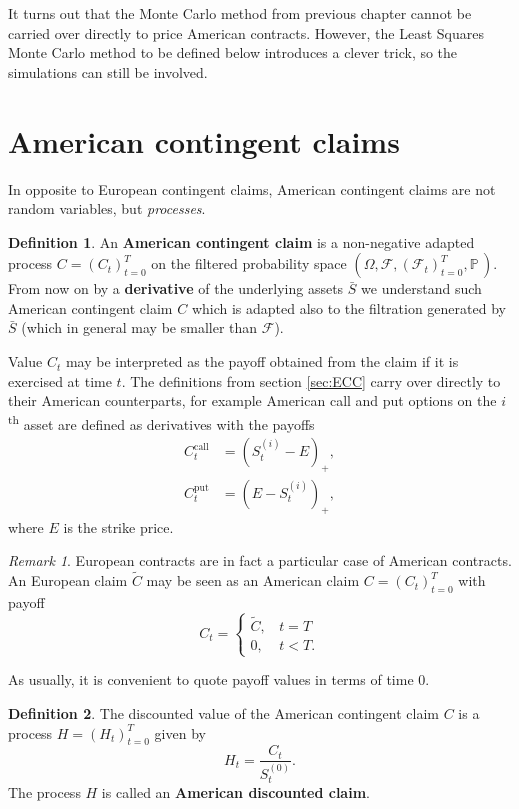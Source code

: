 \documentclass[a4paper,11pt, twoside]{book}
\theoremstyle{definition}
\newtheorem{mydef}{Definition}[chapter]
\theoremstyle{remark}
\newtheorem{remark}{Remark}[chapter]
\newcounter{example}[chapter]
\def\P{{\mathbb{P}}\,}
\def\Sa{\bar{S}}
\begin{document}
It turns out that the Monte Carlo method from previous chapter cannot be carried over directly to price American contracts. However, the Least Squares Monte Carlo method to be defined below introduces a clever trick, so the simulations can still be involved. 

\section{American contingent claims}
In opposite to European contingent claims, American contingent claims are not random variables, but \emph{processes}.
\begin{mydef}
 \label{def:cc_am}
 An \textbf{American contingent claim} is a non-negative adapted process $C = (C_t)_{t=0}^T$ on the filtered probability space $(\Omega, \mathcal{F}, (\mathcal{F}_t)_{t=0}^T, \P)$.
From now on by a \textbf{derivative} of the underlying assets $\Sa$ we understand such American contingent claim $C$ which is adapted also to the filtration generated by $\Sa$ (which in general may be smaller than $\mathcal{F}$).
\end{mydef}
Value $C_t$ may be interpreted as the payoff obtained from the claim if it is exercised at time $t$. The definitions from section \ref{sec:ECC} carry over directly to their American counterparts, for example American call and put options on the $i$\textsuperscript{th} asset are defined as derivatives with the payoffs
\begin{equation*}
 \begin{split}
  C^{\text{call}}_t &= (S^{(i)}_t - E)_+, \\
  C^{\text{put}}_t &= (E - S^{(i)}_t)_+,
 \end{split}
\end{equation*}
where $E$ is the strike price.
\begin{remark}
 European contracts are in fact  a particular case of American contracts. An European claim $\tilde{C}$ may be seen as an American claim $C = (C_t)_{t=0}^T$ with payoff
 \[ C_t = \begin{cases}
         \tilde{C},\ \ \ \ t = T \\
         0,\ \ \ \ \ t < T.
        \end{cases}
        \]
\end{remark}

As usually, it is convenient to quote payoff values in terms of time 0.
\begin{mydef}
 The discounted value of the American contingent claim $C$ is a process $H = (H_t)_{t=0}^T$ given by
 \begin{equation*}
  H_t = \frac{C_t}{S^{(0)}_t}.
 \end{equation*}
 The process $H$ is called an \textbf{American discounted claim}.
\end{mydef}
\end{document}
